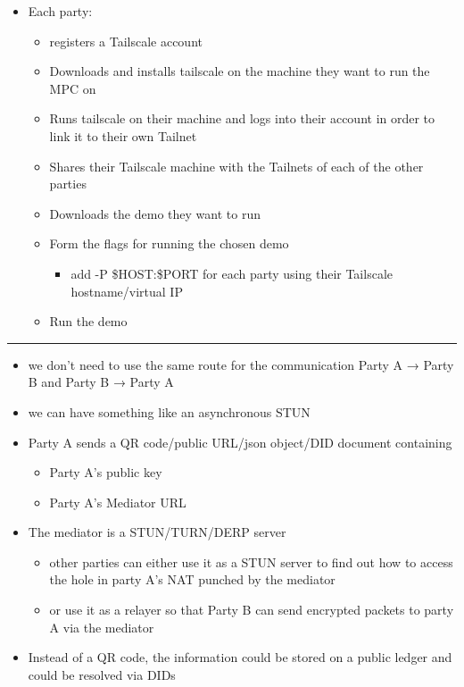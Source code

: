 \begin{itemize}
\tightlist
\item
  Each party:

  \begin{itemize}
  \tightlist
  \item
    registers a Tailscale account
  \item
    Downloads and installs tailscale on the machine they want to run the
    MPC on
  \item
    Runs tailscale on their machine and logs into their account in order
    to link it to their own Tailnet
  \item
    Shares their Tailscale machine with the Tailnets of each of the
    other parties
  \item
    Downloads the demo they want to run
  \item
    Form the flags for running the chosen demo

    \begin{itemize}
    \tightlist
    \item
      add -P \$HOST:\$PORT for each party using their Tailscale
      hostname/virtual IP
    \end{itemize}
  \item
    Run the demo
  \end{itemize}
\end{itemize}

\begin{center}\rule{0.5\linewidth}{0.5pt}\end{center}

\begin{itemize}
\tightlist
\item
  we don't need to use the same route for the communication Party A →
  Party B and Party B → Party A
\item
  we can have something like an asynchronous STUN
\item
  Party A sends a QR code/public URL/json object/DID document containing

  \begin{itemize}
  \tightlist
  \item
    Party A's public key
  \item
    Party A's Mediator URL
  \end{itemize}
\item
  The mediator is a STUN/TURN/DERP server

  \begin{itemize}
  \tightlist
  \item
    other parties can either use it as a STUN server to find out how to
    access the hole in party A's NAT punched by the mediator
  \item
    or use it as a relayer so that Party B can send encrypted packets to
    party A via the mediator
  \end{itemize}
\item
  Instead of a QR code, the information could be stored on a public
  ledger and could be resolved via DIDs
\end{itemize}

